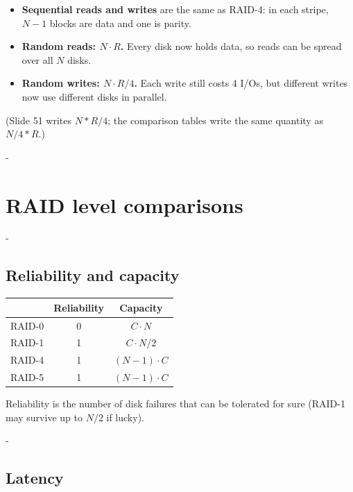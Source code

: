 \documentclass[11pt,a4paper]{article}
\makeatletter
\newcommand{\keepspace}[1]{\par\penalty-100\begingroup
  \setlength{\dimen@}{#1}\dimen@ii\pagegoal\advance\dimen@ii-\pagetotal
  \ifdim\dimen@>\dimen@ii\ifdim\dimen@ii>\z@\vfil\fi\break\fi\endgroup}
\makeatother
\begin{document}
\begin{quizbox}
\begin{itemize}
  \item \textbf{Sequential reads and writes} are the same as RAID-4: in each
        stripe, \(N-1\) blocks are data and one is parity.
  \item \textbf{Random reads: \(N \cdot R\).} Every disk now holds data, so
        reads can be spread over all \(N\) disks.
  \item \textbf{Random writes: \(N \cdot R/4\).} Each write still costs 4
        I/Os, but different writes now use different disks in parallel.
\end{itemize}
{\small (Slide 51 writes \(N * R/4\); the comparison tables write the same
quantity as \(N/4 * R\).)}
\end{quizbox}

\keepspace{9\baselineskip}
\section{RAID level comparisons}

\keepspace{9\baselineskip}
\subsection{Reliability and capacity}

\begin{center}
\renewcommand{\arraystretch}{1.25}
\begin{tabular}{@{}lcc@{}}
\toprule
 & \textbf{Reliability} & \textbf{Capacity} \\
\midrule
RAID-0 & 0 & \(C\cdot N\) \\
RAID-1 & 1 & \(C\cdot N/2\) \\
RAID-4 & 1 & \((N-1)\cdot C\) \\
RAID-5 & 1 & \((N-1)\cdot C\) \\
\bottomrule
\end{tabular}
\end{center}
Reliability is the number of disk failures that can be tolerated for sure
(RAID-1 may survive up to \(N/2\) if lucky).

\keepspace{9\baselineskip}
\subsection{Latency}
\end{document}
